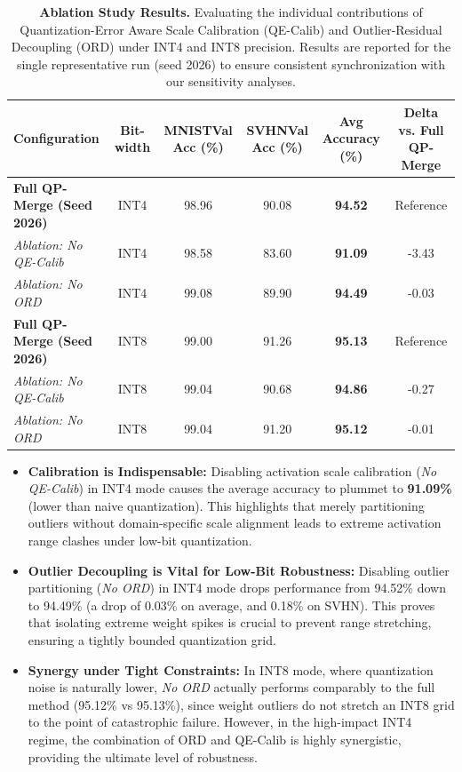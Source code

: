\begin{table}[t]
\caption{\textbf{Ablation Study Results.} Evaluating the individual contributions of Quantization-Error Aware Scale Calibration (QE-Calib) and Outlier-Residual Decoupling (ORD) under INT4 and INT8 precision. Results are reported for the single representative run (seed 2026) to ensure consistent synchronization with our sensitivity analyses.}
\label{tab:ablation_results}
\vskip 0.15in
\begin{center}
\begin{small}
\begin{sc}
\begin{tabular}{lccccc}
\toprule
Configuration & Bit-width & MNISTVal Acc (\%) & SVHNVal Acc (\%) & Avg Accuracy (\%) & Delta vs. Full QP-Merge \\
\midrule
\textbf{Full QP-Merge (Seed 2026)} & INT4 & 98.96 & 90.08 & \textbf{94.52} & Reference \\
\textit{Ablation: No QE-Calib} & INT4 & 98.58 & 83.60 & \textbf{91.09} & -3.43 \\
\textit{Ablation: No ORD} & INT4 & 99.08 & 89.90 & \textbf{94.49} & -0.03 \\
\midrule
\textbf{Full QP-Merge (Seed 2026)} & INT8 & 99.00 & 91.26 & \textbf{95.13} & Reference \\
\textit{Ablation: No QE-Calib} & INT8 & 99.04 & 90.68 & \textbf{94.86} & -0.27 \\
\textit{Ablation: No ORD} & INT8 & 99.04 & 91.20 & \textbf{95.12} & -0.01 \\
\bottomrule
\end{tabular}
\end{sc}
\end{small}
\end{center}
\vskip -0.1in
\end{table}

\begin{itemize}
    \item \textbf{Calibration is Indispensable:} Disabling activation scale calibration (\textit{No QE-Calib}) in INT4 mode causes the average accuracy to plummet to \textbf{91.09\%} (lower than naive quantization). This highlights that merely partitioning outliers without domain-specific scale alignment leads to extreme activation range clashes under low-bit quantization.
    \item \textbf{Outlier Decoupling is Vital for Low-Bit Robustness:} Disabling outlier partitioning (\textit{No ORD}) in INT4 mode drops performance from 94.52\% down to 94.49\% (a drop of 0.03\% on average, and 0.18\% on SVHN). This proves that isolating extreme weight spikes is crucial to prevent range stretching, ensuring a tightly bounded quantization grid.
    \item \textbf{Synergy under Tight Constraints:} In INT8 mode, where quantization noise is naturally lower, \textit{No ORD} actually performs comparably to the full method (95.12\% vs 95.13\%), since weight outliers do not stretch an INT8 grid to the point of catastrophic failure. However, in the high-impact INT4 regime, the combination of ORD and QE-Calib is highly synergistic, providing the ultimate level of robustness.
\end{itemize}

